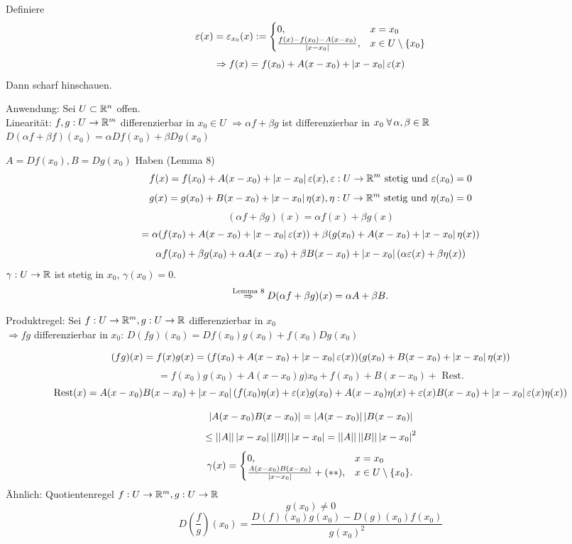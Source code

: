 \documentclass[../ana2.tex]{subfiles}
\begin{document}
\begin{bew}
    Definiere 
    \[ \varepsilon(x) = \varepsilon_{x_0}(x) 
    := \begin{cases}
        0, & x = x_0 \\
        \frac{f(x) - f(x_0) - A(x - x_0)}{\left|x - x_0\right|}, & x\in U \setminus \{x_0\}
    \end{cases} \]
    \[ \Rightarrow f(x) = f(x_0) + A(x - x_0) + \left|x - x_0\right| \varepsilon(x) \]
    Dann scharf hinschauen.
\end{bew}
Anwendung: Sei \( U \subset \mathbb{R}^n \) offen. \\
Linearität: \( f,g:U\rightarrow \mathbb{R}^m \) differenzierbar in \(x_0 \in U\)
\( \Rightarrow \alpha f + \beta g \) ist differenzierbar in 
\(x_0 \; \forall \alpha, \beta \in \R\) \\
\( D(\alpha f + \beta f)(x_0) = \alpha Df(x_0) + \beta Dg(x_0) \)
\begin{bew}
    \( A = Df (x_0), B = Dg(x_0) \)
    Haben (Lemma 8) 
    \[ f(x) = f(x_0) + A(x - x_0) + \left|x - x_0\right|\varepsilon(x), 
    \varepsilon:U\rightarrow \mathbb{R}^m \text{ stetig und } \varepsilon(x_0) = 0 \]
    \[ g(x) = g(x_0) + B(x - x_0) + \left|x - x_0\right|\eta(x), 
    \eta:U\rightarrow \mathbb{R}^m \text{ stetig und } \eta(x_0) = 0 \]
    \[ (\alpha f +\beta g)(x) 
    = \alpha f(x) + \beta g(x) \]
    \[ = \alpha (f(x_0) + A(x - x_0) + \left|x - x_0\right|\varepsilon(x)) 
    + \beta (g(x_0) + A(x - x_0) + \left|x - x_0\right|\eta(x)) \]
    \[ \alpha f(x_0) + \beta g(x_0) + \alpha A(x-x_0)+\beta B(x-x_0) + \left|x-x_0\right|
    (\alpha \varepsilon(x) + \beta \eta(x)) \]
    \( \gamma:U\rightarrow \mathbb{R} \) ist stetig in \(x_0\), 
    \( \gamma(x_0) = 0 \).
    \[ \overset{\text{Lemma 8}}{\Rightarrow} 
    D(\alpha f + \beta g)(x) = \alpha A + \beta B. \]
\end{bew}
Produktregel: Sei \( f:U\rightarrow \mathbb{R}^m, g:U\rightarrow \mathbb{R} \)
differenzierbar in \(x_0\) \\
\( \Rightarrow  fg \) differenzierbar in \(x_0\): 
\( D(fg)(x_0) = Df(x_0)g(x_0) + f(x_0)Dg(x_0) \)
\begin{bew}
    \[ (fg)(x) = f(x)g(x) 
    = (f(x_0) + A(x - x_0) + \left|x - x_0\right|\varepsilon(x)) 
    (g(x_0) + B(x - x_0) + \left|x - x_0\right|\eta(x))  \]
    \[ = f(x_0)g(x_0) + A(x - x_0) g)x_0 
    + f(x_0) + B(x - x_0) + \text{ Rest.} \]
    \[\mathrm{Rest}(x) = A(x-x_0)B(x-x_0) + \left|x-x_0\right|
    (f(x_0)\eta(x) + \varepsilon(x)g(x_0) + A(x-x_0)\eta(x)
    + \varepsilon(x)B(x-x_0) + \left|x-x_0\right| \varepsilon(x)\eta(x))\]

    \[ \left| A(x - x_0) B(x - x_0) \right| 
    = \left|A (x- x_0)\right|\left|B(x-x_0)\right| \]
    \[ \leq \left|\left|A\right|\right|\left|x-x_0\right| \left|\left|B\right|\right|\left|x - x_0\right|
    = \left|\left|A\right|\right| \left|\left|B\right|\right| \left|x - x_0\right|^2 \]
    \[ \gamma(x) = \begin{cases}
        0, &x = x_0\\
        \frac{A(x - x_0)B(x - x_0)}{\left|x - x_0\right|} + (**), &x \in U \setminus \{x_0\}.
    \end{cases} \]
    Ähnlich: Quotientenregel \( f:U\rightarrow \mathbb{R}^m, g:U\rightarrow \mathbb{R} \)
    \[ g(x_0) \neq 0 \]
    \[ D\left(\frac{f}{g}\right)(x_0) 
    = \frac{D(f)(x_0) g(x_0) - D(g)(x_0) f(x_0)}{g(x_0)^2} \]
\end{bew}
\end{document}
